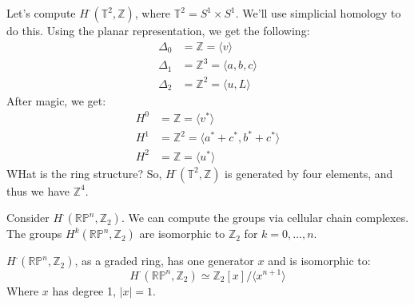     \begin{example}
        Let's compute $H^{\cdot}(\mathbb{T}^{2},\mathbb{Z})$,
        where $\mathbb{T}^{2}=S^{1}\times{S}^{1}$. We'll use
        simplicial homology to do this. Using the planar
        representation, we get the following:
        \begin{subequations}
            \begin{align}
                \Delta_{0}&=\mathbb{Z}
                    =\langle{v}\rangle\\
                \Delta_{1}&=\mathbb{Z}^{3}
                    =\langle{a,b,c}\rangle\\
                \Delta_{2}&=\mathbb{Z}^{2}
                    =\langle{u,L}\rangle
            \end{align}
        \end{subequations}
        After magic, we get:
        \begin{subequations}
            \begin{align}
                H^{0}&=\mathbb{Z}
                    =\langle{v^{*}}\rangle\\
                H^{1}&=\mathbb{Z}^{2}
                    =\langle{a^{*}+c^{*},b^{*}+c^{*}}\rangle\\
                H^{2}&=\mathbb{Z}
                    =\langle{u^{*}}\rangle
            \end{align}
        \end{subequations}
        WHat is the ring structure? So,
        $H^{\cdot}(\mathbb{T}^{2},\mathbb{Z})$ is generated by
        four elements, and thus we have $\mathbb{Z}^{4}$.
    \end{example}
    \begin{example}
        Consider $H^{\cdot}(\mathbb{RP}^{n},\mathbb{Z}_{2})$.
        We can compute the groups via cellular chain complexes.
        The groups $H^{k}(\mathbb{RP}^{n},\mathbb{Z}_{2})$ are
        isomorphic to $\mathbb{Z}_{2}$ for $k=0,\dots,n$.
    \end{example}
    \begin{theorem}
        $H^{\cdot}(\mathbb{RP}^{n},\mathbb{Z}_{2})$, as a
        graded ring, has one generator $x$ and is isomorphic
        to:
        \begin{equation}
            H^{\cdot}(\mathbb{RP}^{n},\mathbb{Z}_{2})
            \simeq\mathbb{Z}_{2}[x]/\langle{x^{n+1}}\rangle
        \end{equation}
        Where $x$ has degree 1, $|x|=1$.
    \end{theorem}
